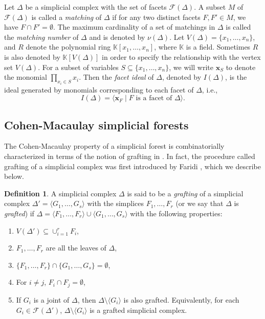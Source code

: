 \documentclass[12pt,a4paper,reqno]{amsart}
\theoremstyle{definition}
\newtheorem{definition}[proposition]{Definition}
\def\K{\mathbb{K}}
\def\D{\Delta}
\def\F{\mathcal{F}}
\def\l{\langle}
\def\r{\rangle}
\begin{document}
Let $\D$ be a simplicial complex with the set of facets $\F(\D)$. A subset $M$ of $\F(\D)$ is called a {\it matching} of $\D$ if for any two distinct facets $F,F'\in M$, we have $F\cap F'=\emptyset$. The maximum cardinality of a set of matchings in $\D$ is called the {\it matching number} of $\D$ and is denoted by $\nu(\D)$. Let $V(\D)=\{x_1,\ldots,x_n\}$, and $R$ denote the polynomial ring $\K[x_1,\ldots , x_n]$, where $\K$ is a field. Sometimes $R$ is also denoted by $\mathbb K[V(\D)]$ in order to specify the relationship with the vertex set $V(\D)$. For a subset of variables $S\subseteq \{x_1,\ldots , x_n\}$, we will write $\mathbf{x}_S$ to denote the monomial $\prod_{x_i\in S}x_i$. Then the \textit{facet ideal} of $\D$, denoted by $I(\D)$, is the ideal generated by monomials corresponding to each facet of $\D$, i.e.,
\[
I(\D)=\langle \mathbf{x}_F \mid F \text{ is a facet of } \D \rangle.
\]



\subsection{Cohen-Macaulay simplicial forests} The Cohen-Macaulay property of a simplicial forest is combinatorially characterized in terms of the notion of grafting in \cite{Faridi2005}. In fact, the procedure called grafting of a simplicial complex was first introduced by Faridi \cite{Faridi2005}, which we describe below.

\begin{definition}\cite[Definition 7.1]{Faridi2005}\label{CM SF defn}
    A simplicial complex $\D$ is said to be a \textit{grafting} of a simplicial complex $\D'=\langle G_1,\ldots , G_s\rangle$ with the simplices $F_1,\ldots ,F_r$ (or we say that $\D$ is \textit{grafted}) if $\D=\langle F_1,\ldots ,F_r\rangle\cup \langle G_1,\ldots , G_s\rangle$ with the following properties:
    \begin{enumerate}
        \item $V(\D')\subseteq \cup_{i=1}^r F_i$,
        \item $F_1,\ldots ,F_r$ are all the leaves of $\D$,
        \item $\{ F_1,\ldots ,F_r\} \cap \{ G_1,\ldots , G_s\}=\emptyset$,
        \item For $i\neq j$, $F_i\cap F_j=\emptyset$,
        \item If $G_i$ is a joint of $\D$, then $\D\setminus \langle G_i \rangle$ is also grafted. Equivalently, for each $G_i\in \F(\Delta')$, $\D\setminus\l G_i\r$ is a grafted simplicial complex.
    \end{enumerate}
\end{definition}
\end{document}
